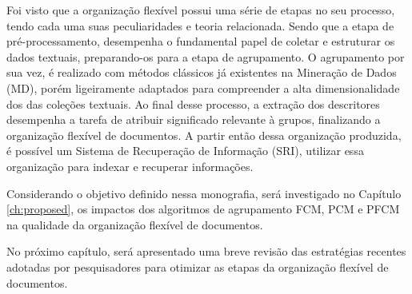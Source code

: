 Foi visto que a organização flexível possui uma série de etapas no seu processo, tendo
cada uma suas peculiaridades e teoria relacionada. Sendo que a etapa de pré-processamento,
desempenha o fundamental papel de coletar e estruturar os dados textuais, preparando-os para a etapa
de agrupamento. O agrupamento por sua vez, é realizado com métodos clássicos já existentes na
Mineração de Dados (MD), porém ligeiramente adaptados para compreender a alta dimensionalidade dos
das coleções textuais. Ao final desse processo, a extração dos descritores desempenha a tarefa de
atribuir significado relevante à grupos, finalizando a organização flexível de documentos. 
A partir então dessa organização produzida, é possível um Sistema de Recuperação de Informação
(SRI), utilizar essa organização para indexar e recuperar informações.

Considerando o objetivo definido nessa monografia, será investigado no Capítulo \ref{ch:proposed},
os impactos dos algoritmos de agrupamento FCM, PCM e PFCM na qualidade da organização flexível de
documentos.

No próximo capítulo, será apresentado uma breve revisão das estratégias recentes adotadas por
pesquisadores para otimizar as etapas da organização flexível de documentos.
